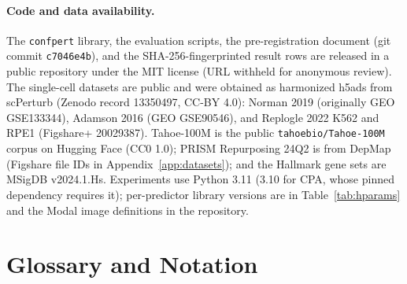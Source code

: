 \documentclass{article}
\newif\ifcameraready
\begin{document}
\paragraph{Code and data availability.} The \texttt{confpert} library, the evaluation scripts, the pre-registration document (git commit \texttt{c7046e4b}), and the SHA-256-fingerprinted result rows are released \ifcameraready at \url{https://github.com/alwaniaayan6-png/confpert} (MIT license)\else in a public repository under the MIT license (URL withheld for anonymous review)\fi. The single-cell datasets are public and were obtained as harmonized h5ads from scPerturb \citep{peidli2024scperturb} (Zenodo record 13350497, CC-BY 4.0): Norman 2019 (originally GEO GSE133344), Adamson 2016 (GEO GSE90546), and Replogle 2022 K562 and RPE1 (Figshare+ 20029387). Tahoe-100M is the public \texttt{tahoebio/Tahoe-100M} corpus on Hugging Face (CC0 1.0); PRISM Repurposing 24Q2 is from DepMap (Figshare file IDs in Appendix~\ref{app:datasets}); and the Hallmark gene sets are MSigDB v2024.1.Hs. Experiments use Python 3.11 (3.10 for CPA, whose pinned dependency requires it); per-predictor library versions are in Table~\ref{tab:hparams} and the Modal image definitions in the repository.




\newpage
\appendix
\onecolumn

\section{Glossary and Notation}
\label{app:glossary}
\end{document}
